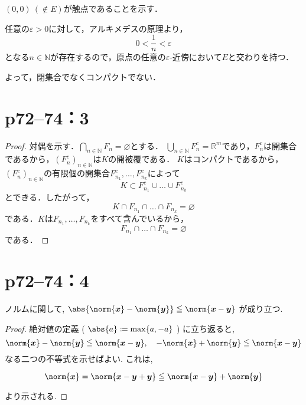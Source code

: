 \begin{tleftbar}
    $(0,0)~(\notin E)$が触点であることを示す．

    任意の$\varepsilon >0$に対して，アルキメデスの原理より，
    \[
        0 < \frac{1}{n} < \varepsilon
    \]
    となる$n \in \mathbb{N}$が存在するので，原点の任意の$\varepsilon$-近傍において$E$と交わりを持つ．

    よって，閉集合でなくコンパクトでない．
\end{tleftbar}


\newpage
\section*{p72--74：3}

\begin{leftbar}
    \begin{proof}
        対偶を示す．$\bigcap_{n \in \mathbb{N}}F_n = \varnothing$とする．
        $\bigcup_{n \in \mathbb{N}}F_n^c = \mathbb{R}^m$であり，$F_n^c$は開集合であるから，$(F_n^c)_{n \in \mathbb{N}}$は$K$の開被覆である．
        $K$はコンパクトであるから，$(F_n^c)_{n \in \mathbb{N}}$の有限個の開集合$F_{n_1}^c,\ldots,F_{n_k}^c$によって
        \[
            K \subset F_{n_1}^c \cup \ldots \cup F_{n_k}^c
        \]
        とできる．したがって，
        \[
            K \cap F_{n_1} \cap \ldots \cap F_{n_k} = \varnothing
        \]
        である．$K$は$F_{n_1},\ldots,F_{n_k}$をすべて含んでいるから，
        \[
            F_{n_1} \cap \ldots \cap F_{n_k} = \varnothing
        \]
        である．
    \end{proof}
\end{leftbar}

\newpage

\section*{p72--74：4}


ノルムに関して, $\abs{\norm{ \bm{x}  }- \norm{ \bm{y} } } \leq \norm{ \bm{x} - \bm{y} }$ が成り立つ.


\begin{proof}
    絶対値の定義 ( $\abs{a} \coloneqq \max \{ a , -a \}$ ) に立ち返ると,
    \[
        \norm{ \bm{x}  }- \norm{ \bm{y} } \leq \norm{ \bm{x} - \bm{y} } ,\quad  - \norm{ \bm{x} } + \norm{ \bm{y} } \leq \norm{ \bm{x} - \bm{y} }
    \]
    なる二つの不等式を示せばよい. これは,

    \[
        \norm{ \bm{x} } = \norm{ \bm{x} - \bm{y} + \bm{y} } \leq \norm{ \bm x - \bm y } + \norm{ \bm{y} }
    \]

    より示される.
\end{proof}

